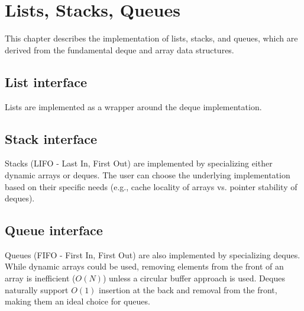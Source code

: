 \chapter{Lists, Stacks, Queues}\label{chap:linear}

This chapter describes the implementation of lists, stacks, and queues, which are derived from the fundamental deque and array data structures.

\section{List interface}\label{lists:interface}

Lists are implemented as a wrapper around the deque implementation.

\begin{code}
  
  \caption{The generic list interface.}
  \label{code:list:interface}
\end{code}

\section{Stack interface}\label{stacks:interface}

Stacks (LIFO - Last In, First Out) are implemented by specializing either dynamic arrays or deques. The user can choose the underlying implementation based on their specific needs (e.g., cache locality of arrays vs. pointer stability of deques).

\begin{code}
  
  \caption{The generic stack interface.}
  \label{code:stack:interface}
\end{code}

\section{Queue interface}\label{queues:interface}

Queues (FIFO - First In, First Out) are also implemented by specializing deques. While dynamic arrays could be used, removing elements from the front of an array is inefficient ($O(N)$) unless a circular buffer approach is used. Deques naturally support $O(1)$ insertion at the back and removal from the front, making them an ideal choice for queues.

\begin{code}
  
  \caption{The generic queue interface.}
  \label{code:queue:interface}
\end{code}

